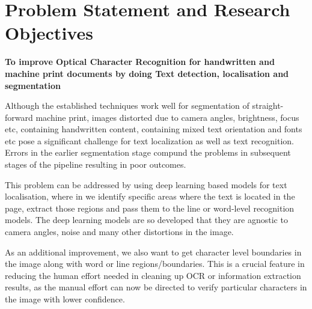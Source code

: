 
%

{\let\clearpage\relax \chapter{Problem Statement and Research Objectives}}

\textbf{To improve Optical Character Recognition for handwritten and machine print documents by doing Text detection, localisation and segmentation}
\newline

Although the established techniques work well for segmentation of straight-forward machine print, images distorted due to camera angles, brightness, focus etc, containing handwritten content, containing mixed text orientation and fonts etc pose a significant challenge for text localization as well as text recognition. Errors in the earlier segmentation stage compund the problems in subsequent stages of the pipeline resulting in poor outcomes.

This problem can be addressed by using deep learning based models for text localisation, where in we identify specific areas where the text is located in the page, extract those regions and pass them to the line or word-level recognition models. The deep learning models are so developed that they are agnostic to camera angles, noise and many other distortions in the image.

As an additional improvement, we also want to get character level boundaries in the image along with word or line regions/boundaries. This is a crucial feature in reducing the human effort needed in cleaning up OCR or information extraction results, as the manual effort can now be directed to verify particular characters in the image with lower confidence.


